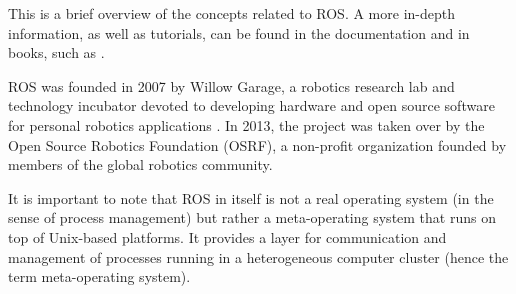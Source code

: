 \documentclass[english,inz,shortabstract]{iithesis}
\begin{document}
	This is a brief overview of the concepts related to ROS. A more in-depth information, as well as tutorials, can be found in the documentation \cite{ros:documentation} and in books, such as \cite{ros:mastering}.

	ROS was founded in 2007 by Willow Garage, a robotics research lab and technology incubator devoted to developing hardware and open source software for personal robotics applications \cite{ros:willowgarage}. In 2013, the project was taken over by the Open Source Robotics Foundation (OSRF), a non-profit organization founded by members of the global robotics community.

	It is important to note that ROS in itself is not a real operating system (in the sense of process management) but rather a meta-operating system that runs on top of Unix-based platforms. It provides a layer for communication and management of processes running in a heterogeneous computer cluster (hence the term meta-operating system).
\end{document}
